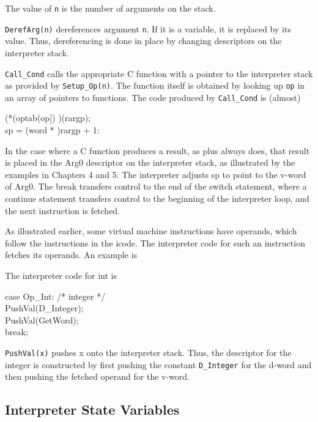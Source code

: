 
The value of \texttt{n} is the number of arguments on the stack.

\texttt{DerefArg(n)} dereferences argument \texttt{n}. If it is a
variable, it is replaced by its value. Thus, dereferencing is done in
place by changing descriptors on the interpreter stack.

\texttt{Call\_Cond} calls the appropriate C function with a pointer to
the interpreter stack as provided by \texttt{Setup\_Op(n)}. The
function itself is obtained by looking up \texttt{op} in an array of
pointers to functions.  The code produced by \texttt{Call\_Cond} is
(almost)

\begin{iconcode}
\>(*(optab(op]) )(rargp);\\
\>sp = (word * )rargp + 1:
\end{iconcode}

In the case where a C function produces a result, as plus always does,
that result is placed in the Arg0 descriptor on the interpreter stack,
as illustrated by the examples in Chapters 4 and 5. The interpreter
adjusts sp to point to the v-word of Arg0. The break transfers control
to the end of the switch statement, where a continue statement
transfers control to the beginning of the interpreter loop, and the
next instruction is fetched.

As illustrated earlier, some virtual machine instructions have
operands, which follow the instructions in the icode. The interpreter
code for such an instruction fetches its operands. An example is


The interpreter code for int is

\begin{iconcode}
\>case Op\_Int: /* integer */\\
\>PushVal(D\_Integer);\\
\>PushVal(GetWord);\\
\>break;
\end{iconcode}

\texttt{PushVal(x)} pushes x onto the interpreter stack. Thus, the descriptor
for the integer is constructed by first pushing the constant \texttt{D\_Integer}
for the d-word and then pushing the fetched operand for the v-word.

\subsection{Interpreter State Variables}

